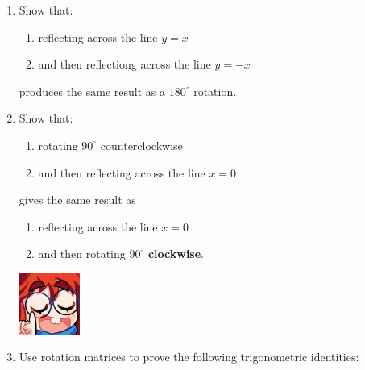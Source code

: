 \documentclass{article}
\begin{document}
\begin{enumerate}
    \item Show that:\begin{enumerate}
        \item reflecting across the line \(y=x\)
        \item and then reflectiong across the line \(y = -x\) 
    \end{enumerate} produces the same result as a \(180^\circ\) rotation. 
    \item Show that:\begin{enumerate}
        \item rotating \(90^\circ\) counterclockwise
        \item and then reflecting across the line \(x=0\)
    \end{enumerate} gives the same result as\begin{enumerate}
        \item reflecting across the line \(x=0\)
        \item and then rotating \(90^\circ\) \textbf{clockwise}.
    \end{enumerate}
    \begin{minipage}{.14\textwidth}
        \vspace{0pt}
        \includegraphics[width=2cm]{nerd_maddy.png}
    \end{minipage}%
    \item Use rotation matrices to prove the following trigonometric identities:\begin{enumerate}

\end{enumerate}
\end{enumerate}
\end{document}
